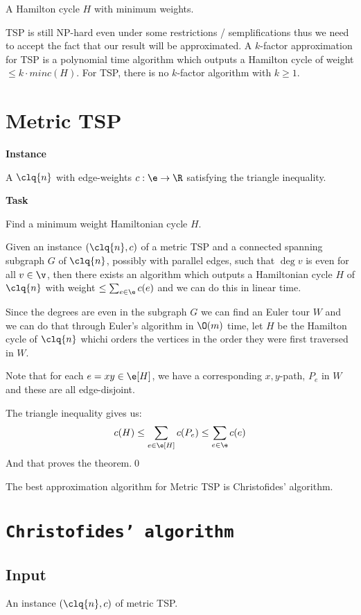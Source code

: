 A Hamilton cycle $H$ with minimum weights.

\noindent TSP is still NP-hard even under some restrictions / semplifications thus we need to accept the fact that our result will be approximated. A $k$-factor approximation for TSP is a polynomial time algorithm which outputs a Hamilton cycle of weight $\leq k \cdot min c(H)$. For TSP, there is no $k$-factor algorithm with $k \geq 1$.

\section{Metric TSP}
\textbf{Instance}

A $\clq{n}$ with edge-weights $c: \e \rightarrow \R$ satisfying the triangle inequality.

\noindent\textbf{Task}

Find a minimum weight Hamiltonian cycle $H$.

\begin{customlemma}{5.4}
\label{lemma:5.4}
    Given an instance $(\clq{n}, c)$ of a metric TSP and a connected spanning subgraph $G$ of $\clq{n}$, possibly with parallel edges, such that $\deg{v}$ is even for all $v \in \v$, then there exists an algorithm which outputs a Hamiltonian cycle $H$ of $\clq{n}$ with weight $\leq \sum_{e \in \e}c(e)$ and we can do this in linear time.
\end{customlemma}
\begin{prf}
    Since the degrees are even in the subgraph $G$ we can find an Euler tour $W$ and we can do that through Euler's algorithm in $\O(m)$ time, let $H$ be the Hamilton cycle of $\clq{n}$ whichi orders the vertices in the order they were first traversed in $W$.

    Note that for each $e = xy \in \e[H]$, we have a corresponding $x, y$-path, $P_e$ in $W$ and these are all edge-disjoint.

    The triangle inequality gives us:
    \begin{equation*}
        c(H) \leq \sum_{e \in \e[H]}c(P_e) \leq \sum_{e \in \e} c(e)
    \end{equation*}
    And that proves the theorem.\qed
\end{prf}
The best approximation algorithm for Metric TSP is Christofides' algorithm.
\section{\texttt{Christofides' algorithm}}
\subsection{Input}
    An instance $(\clq{n}, c)$ of metric TSP.
